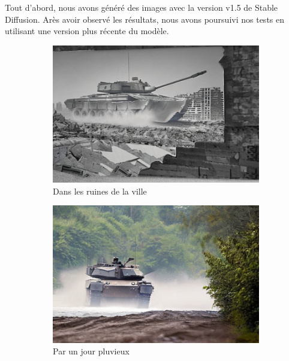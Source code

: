Tout d'abord, nous avons généré des images avec la version v1.5 de Stable Diffusion.
Arès avoir observé les résultats, nous avons poursuivi nos tests en utilisant une version plus récente du modèle.

\begin{figure}[H]
    \centering
    \begin{subfigure}[b]{0.49\textwidth}
        \centering
        \includegraphics[width=\textwidth]{./images/v2_tank-city_ruins-1.png}
        \caption{Dans les ruines de la ville}
    \end{subfigure}
    \begin{subfigure}[b]{0.49\textwidth}
        \centering
        \includegraphics[width=\textwidth]{./images/v2_tank-rainy_day-3.png}
        \caption{Par un jour pluvieux}
    \end{subfigure}
    \hfill
    \begin{subfigure}[b]{0.49\textwidth}

\end{subfigure}
\end{figure}
